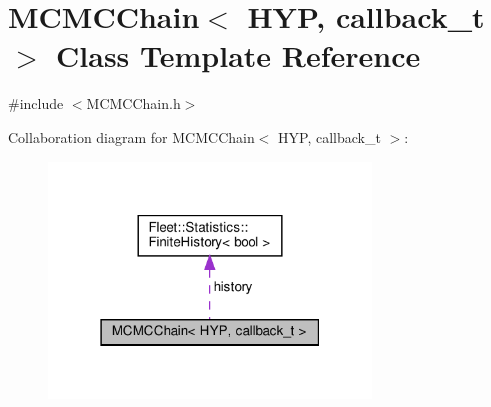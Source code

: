 \hypertarget{class_m_c_m_c_chain}{}\section{M\+C\+M\+C\+Chain$<$ H\+YP, callback\+\_\+t $>$ Class Template Reference}
\label{class_m_c_m_c_chain}


{\ttfamily \#include $<$M\+C\+M\+C\+Chain.\+h$>$}



Collaboration diagram for M\+C\+M\+C\+Chain$<$ H\+YP, callback\+\_\+t $>$\+:
\nopagebreak
\begin{figure}[H]
\begin{center}
\leavevmode
\includegraphics[width=243pt]{class_m_c_m_c_chain__coll__graph}
\end{center}
\end{figure}
